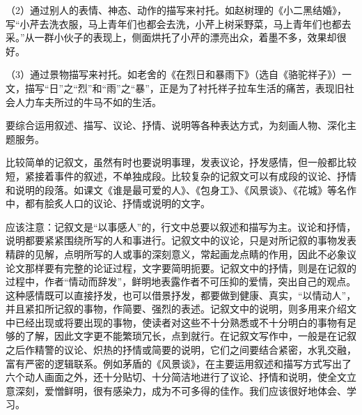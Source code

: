 （2）通过别人的表情、神态、动作的描写来衬托。如赵树理的《小二黑结婚》，写“小芹去洗衣服，马上青年们也都会去洗，小芹上树采野菜，马上青年们也都去采。”从一群小伙子的表现上，侧面烘托了小芹的漂亮出众，着墨不多，效果却很好。

（3）通过景物描写来衬托。如老舍的《在烈日和暴雨下》（选自《骆驼祥子》）一文，描写“日”之“烈”和“雨”之“暴”，正是为了衬托祥子拉车生活的痛苦，表现旧社会人力车夫所过的牛马不如的生活。

要综合运用叙述、描写、议论、抒情、说明等各种表达方式，为刻画人物、深化主题服务。

比较简单的记叙文，虽然有时也要说明事理，发表议论，抒发感情，但一般都比较短，紧接着事件的叙述，不单独成段。比较复杂的记叙文可以有成段的议论、抒情和说明的段落。如课文《谁是最可爱的人》、《包身工》、《风景谈》、《花城》等名作中，都有脍炙人口的议论、抒情或说明的文字。

应该注意：记叙文是“以事感人”的，行文中总要以叙述和描写为主。议论和抒情，说明都要紧紧围绕所写的人和事进行。记叙文中的议论，只是对所记叙的事物发表精辟的见解，点明所写的人或事的深刻意义，常起画龙点睛的作用，因此不必象议论文那样要有完整的论证过程，文字要简明扼要。记叙文中的抒情，则是在记叙的过程中，作者“情动而辞发”，鲜明地表露作者不可压抑的爱情，突出自己的观点。这种感情既可以直接抒发，也可以借景抒发，都要做到健康、真实，“以情动人”，并且紧扣所记叙的事物，作简要、强烈的表述。记叙文中的说明，则多用来介绍文中已经出现或将要出现的事物，使读者对这些不十分熟悉或不十分明白的事物有足够的了解，因此文字更不能繁琐冗长，点到就行。在记叙文写作中，一般是在记叙之后作精警的议论、炽热的抒情或简要的说明，它们之间要结合紧密，水乳交融，富有严密的逻辑联系。例如茅盾的《风景谈》，在主要运用叙述和描写方式写出了六个动人画面之外，还十分贴切、十分简洁地进行了议论、抒情和说明，使全文立意深刻，爱憎鲜明，很有感染力，成为不可多得的佳作。我们应该很好地体会、学习。
\newpage